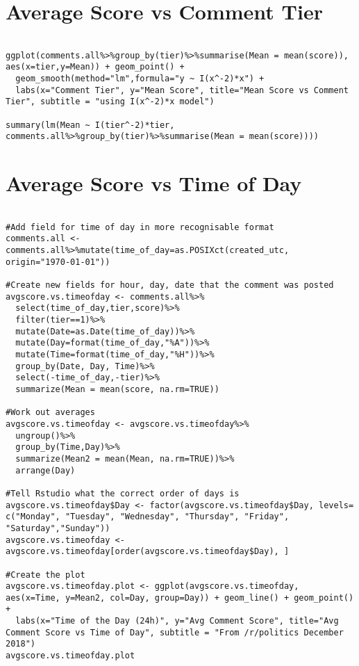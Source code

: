 \section{Average Score vs Comment Tier}
\label{sec:AppendexA8}
\begin{lstlisting}

ggplot(comments.all%>%group_by(tier)%>%summarise(Mean = mean(score)), aes(x=tier,y=Mean)) + geom_point() + 
  geom_smooth(method="lm",formula="y ~ I(x^-2)*x") + 
  labs(x="Comment Tier", y="Mean Score", title="Mean Score vs Comment Tier", subtitle = "using I(x^-2)*x model")

summary(lm(Mean ~ I(tier^-2)*tier, comments.all%>%group_by(tier)%>%summarise(Mean = mean(score))))

\end{lstlisting}


\section{Average Score vs Time of Day}
\label{sec:AppendexA9}
\begin{lstlisting}

#Add field for time of day in more recognisable format
comments.all <- comments.all%>%mutate(time_of_day=as.POSIXct(created_utc, origin="1970-01-01"))

#Create new fields for hour, day, date that the comment was posted
avgscore.vs.timeofday <- comments.all%>%
  select(time_of_day,tier,score)%>%
  filter(tier==1)%>%
  mutate(Date=as.Date(time_of_day))%>%
  mutate(Day=format(time_of_day,"%A"))%>%
  mutate(Time=format(time_of_day,"%H"))%>%
  group_by(Date, Day, Time)%>%
  select(-time_of_day,-tier)%>%
  summarize(Mean = mean(score, na.rm=TRUE))

#Work out averages
avgscore.vs.timeofday <- avgscore.vs.timeofday%>%
  ungroup()%>%
  group_by(Time,Day)%>%
  summarize(Mean2 = mean(Mean, na.rm=TRUE))%>%
  arrange(Day)

#Tell Rstudio what the correct order of days is
avgscore.vs.timeofday$Day <- factor(avgscore.vs.timeofday$Day, levels= c("Monday", "Tuesday", "Wednesday", "Thursday", "Friday", "Saturday","Sunday"))
avgscore.vs.timeofday <- avgscore.vs.timeofday[order(avgscore.vs.timeofday$Day), ]

#Create the plot
avgscore.vs.timeofday.plot <- ggplot(avgscore.vs.timeofday, aes(x=Time, y=Mean2, col=Day, group=Day)) + geom_line() + geom_point() + 
  labs(x="Time of the Day (24h)", y="Avg Comment Score", title="Avg Comment Score vs Time of Day", subtitle = "From /r/politics December 2018")
avgscore.vs.timeofday.plot

\end{lstlisting}


